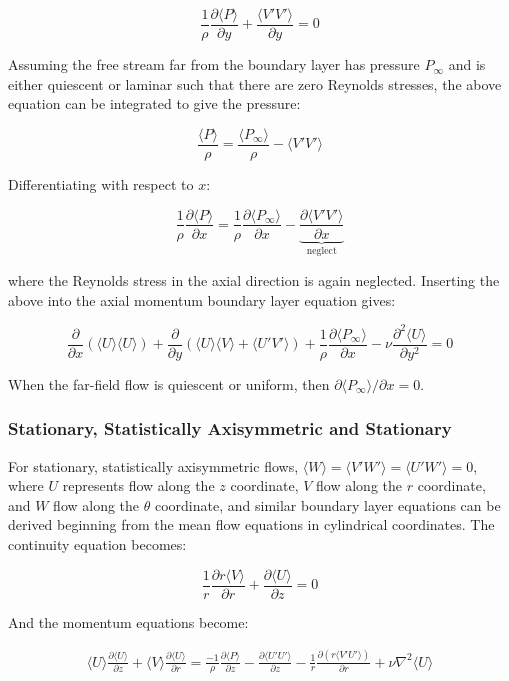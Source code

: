 \documentclass[10pt]{article}
\newcommand{\beq}{\begin{equation}}
\newcommand{\eeq}{\end{equation}}
\newcommand{\beqa}{\begin{equation}\begin{aligned}}
\newcommand{\eeqa}{\end{aligned}\end{equation}}
\newcommand{\la}{\langle}
\newcommand{\ra}{\rangle}
\begin{document}
\begin{flushleft}
\beq
\frac{1}{\rho}\frac{\partial\la P\ra}{\partial y}+\frac{\la V'V'\ra}{\partial y}=0
\eeq

Assuming the free stream far from the boundary layer has pressure \(P_{\infty}\) and is either quiescent or laminar such that there are zero Reynolds stresses, the above equation can be integrated to give the pressure:

\beq
\frac{\la P\ra}{\rho}=\frac{\la P_{\infty}\ra}{\rho}-\la V'V'\ra
\eeq

Differentiating with respect to \(x\):

\beq
\frac{1}{\rho}\frac{\partial \la P\ra}{\partial x}=\frac{1}{\rho}\frac{\partial \la P_{\infty}\ra}{\partial x}-\underbrace{\frac{\partial \la V'V'\ra}{\partial x}}_{\textrm{neglect}}
\eeq

where the Reynolds stress in the axial direction is again neglected. Inserting the above into the axial momentum boundary layer equation gives:

\beq
\frac{\partial}{\partial x}\left(\la U\ra\la U\ra\right)+\frac{\partial}{\partial y}\left(\la U\ra\la V\ra+\la U'V'\ra\right)+\frac{1}{\rho}\frac{\partial \la P_{\infty}\ra}{\partial x}-\nu\frac{\partial^2 \la U\ra}{\partial y^2}=0
\eeq

When the far-field flow is quiescent or uniform, then \(\partial\la P_{\infty}\ra/\partial x=0\). 



\subsubsection{Stationary, Statistically Axisymmetric and Stationary}
For stationary, statistically axisymmetric flows, \(\la W\ra=\la V'W'\ra=\la U'W'\ra=0\), where \(U\) represents flow along the \(z\) coordinate, \(V\) flow along the \(r\) coordinate, and \(W\) flow along the \(\theta\) coordinate, and similar boundary layer equations can be derived beginning from the mean flow equations in cylindrical coordinates. The continuity equation becomes:

\beq
\frac{1}{r}\frac{\partial r\la V\ra}{\partial r}+\frac{\partial \la U\ra}{\partial z}=0
\eeq

And the momentum equations become:

\beqa
\la U\ra\frac{\partial \la U\ra}{\partial z}+\la V\ra\frac{\partial \la U\ra}{\partial r}=\frac{-1}{\rho}\frac{\partial \la P\ra}{\partial z}-\frac{\partial \la U'U'\ra}{\partial z}-\frac{1}{r}\frac{\partial (r\la V'U'\ra)}{\partial r}+\nu\nabla^2\la U\ra
\eeqa





\end{flushleft}
\end{document}
